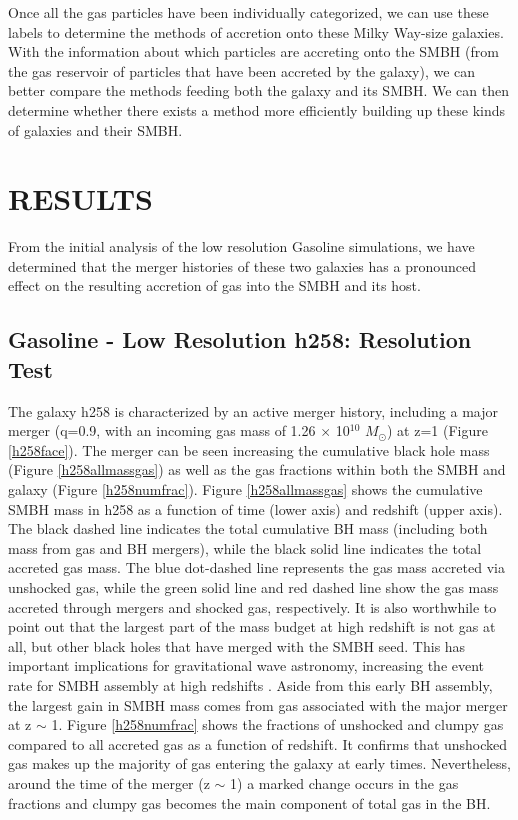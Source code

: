 \documentclass[12pt,headA,chapB]{fiskthesis}
\begin{document}
Once all the gas particles have been individually categorized, we can use these labels to determine the methods of accretion onto these Milky Way-size galaxies. With the information about which particles are accreting onto the SMBH (from the gas reservoir of particles that have been accreted by the galaxy), we can better compare the methods feeding both the galaxy and its SMBH. We can then determine whether there exists a method more efficiently building up these kinds of galaxies and their SMBH.


\chapter{\normalsize RESULTS}
\thispagestyle{empty}
From the initial analysis of the low resolution Gasoline simulations, we have determined that the merger histories of these two galaxies has a pronounced effect on the resulting accretion of gas into the SMBH and its host. 

\section{Gasoline - Low Resolution h258: Resolution Test}
	
The galaxy h258 is characterized by an active merger history, including a major merger (q=0.9, with an incoming gas mass of 1.26 $\times$ 10$^10$ $M_{\odot}$) at z=1 (Figure \ref{h258face}). The merger can be seen increasing the cumulative black hole mass (Figure \ref{h258allmassgas}) as well as the gas fractions within both the SMBH and galaxy (Figure \ref{h258numfrac}). Figure \ref{h258allmassgas} shows the cumulative SMBH mass in h258 as a function of time (lower axis) and redshift (upper axis). The black dashed line indicates the total cumulative BH mass (including both mass from gas and BH mergers), while the black solid line indicates the total accreted gas mass. The blue dot-dashed line represents the gas mass accreted via unshocked gas, while the green solid line and red dashed line show the gas mass accreted through mergers and shocked gas, respectively. It is also worthwhile to point out that the largest part of the mass budget at high redshift is not gas at all, but other black holes that have merged with the SMBH seed. This has important implications for gravitational wave astronomy, increasing the event rate for SMBH assembly at high redshifts \citep{Holley-Bockelmann2010}. Aside from this early BH assembly, the largest gain in SMBH mass comes from gas associated with the major merger at z $\sim$ 1. Figure \ref{h258numfrac} shows the fractions of unshocked and clumpy gas compared to all accreted gas as a function of redshift. It confirms that unshocked gas makes up the majority of gas entering the galaxy at early times. Nevertheless, around the time of the merger (z $\sim$ 1) a marked change occurs in the gas fractions and clumpy gas becomes the main component of total gas in the BH.
\end{document}

